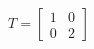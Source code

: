 \documentclass[preview]{standalone}
\begin{document}
\begin{align*}
T = \begin{bmatrix} 1 & 0 \\ 0 & 2\end{bmatrix}
\end{align*}
\end{document}
